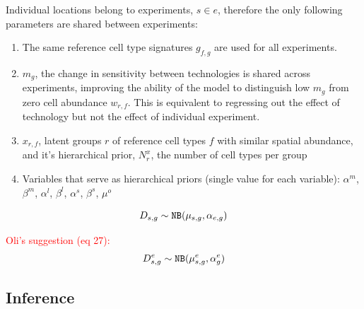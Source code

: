 \documentclass[11pt,a4paper]{article}
\newcommand{\red}{\textcolor{red}}
\begin{document}
Individual locations belong to experiments, $s \in e$, therefore the only following parameters are shared between experiments:
\begin{enumerate}

    \item The same reference cell type signatures $g_{f,g}$ are used for all experiments.
    
    \item $m_{g}$, the change in sensitivity between technologies is shared across experiments, improving the ability of the model to distinguish low $m_{g}$ from zero cell abundance $w_{r,f}$. This is equivalent to regressing out the effect of technology but not the effect of individual experiment. 
    
    \item $x_{r,f}$, latent groups $r$ of reference cell types $f$ with similar spatial abundance, and it's hierarchical prior, $N_r^{x}$, the number of cell types per group
    
    \item Variables that serve as hierarchical priors (single value for each variable): $\alpha^m$, $\beta^m$, $\alpha^l$, $\beta^l$, $\alpha^s$, $\beta^s$, $\mu^o$
    
\end{enumerate}

\begin{equation} \label{eq:c2l:1multi}
D_{s,g} \sim \mathtt{NB}(\mu_{s,g}, \alpha_{e,g}) \\
\end{equation}

\red{\< Oli's suggestion (eq 27):}
\begin{equation} \label{eq:c2l:1multiO}
D_{s,g}^{e} \sim \mathtt{NB}(\mu_{s,g}^{e}, \alpha_{g}^{e}) \\
\end{equation}

\subsection{Inference} \label{c2l_inference}
\end{document}
